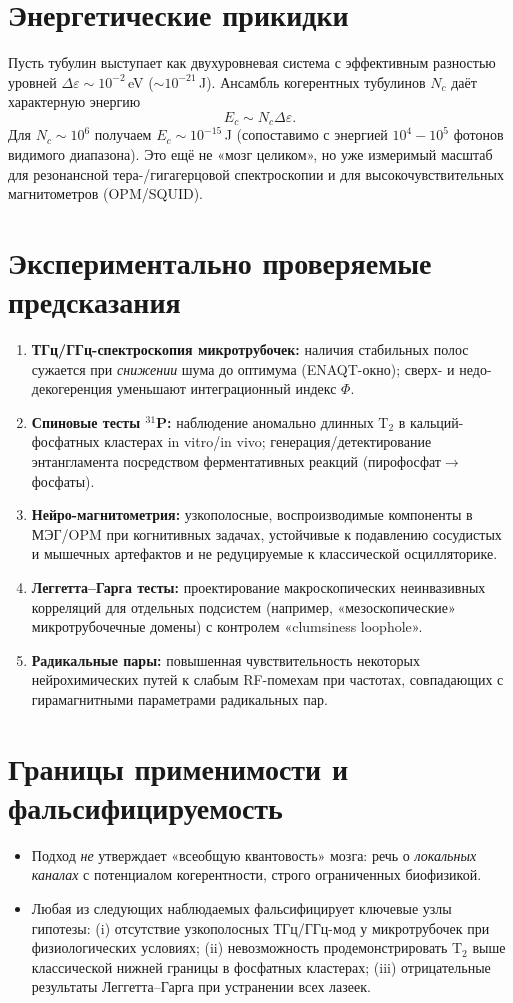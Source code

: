 \documentclass[12pt,a4paper]{article}
\begin{document}
\section{Энергетические прикидки}
Пусть тубулин выступает как двухуровневая система с эффективным разностью уровней $\Delta \varepsilon \sim 10^{-2}$\,eV ($\sim 10^{-21}$\,J). Ансамбль когерентных тубулинов $N_c$ даёт характерную энергию
\[
E_c \sim N_c \Delta\varepsilon.
\]
Для $N_c \sim 10^6$ получаем $E_c \sim 10^{-15}$\,J (сопоставимо с энергией $10^{4}\!-\!10^{5}$ фотонов видимого диапазона). Это ещё не «мозг целиком», но уже измеримый масштаб для резонансной тера-/гигагерцовой спектроскопии и для высокочувствительных магнитометров (OPM/SQUID).

\section{Экспериментально проверяемые предсказания}
\begin{enumerate}
\item \textbf{ТГц/ГГц-спектроскопия микротрубочек:} наличия стабильных полос сужается при \emph{снижении} шума до оптимума (ENAQT-окно); сверх- и недо-декогеренция уменьшают интеграционный индекс $\Phi$.
\item \textbf{Спиновые тесты $^{31}$P:} наблюдение аномально длинных T$_2$ в кальций-фосфатных кластерах in vitro/in vivo; генерация/детектирование энтангламента посредством ферментативных реакций (пирофосфат$\to$фосфаты).
\item \textbf{Нейро-магнитометрия:} узкополосные, воспроизводимые компоненты в МЭГ/OPM при когнитивных задачах, устойчивые к подавлению сосудистых и мышечных артефактов и не редуцируемые к классической осцилляторике.
\item \textbf{Леггетта–Гарга тесты:} проектирование макроскопических неинвазивных корреляций для отдельных подсистем (например, «мезоскопические» микротрубочечные домены) с контролем «clumsiness loophole».
\item \textbf{Радикальные пары:} повышенная чувствительность некоторых нейрохимических путей к слабым RF-помехам при частотах, совпадающих с гирамагнитными параметрами радикальных пар.
\end{enumerate}

\section{Границы применимости и фальсифицируемость}
\begin{itemize}
\item Подход \emph{не} утверждает «всеобщую квантовость» мозга: речь о \emph{локальных каналах} с потенциалом когерентности, строго ограниченных биофизикой.
\item Любая из следующих наблюдаемых фальсифицирует ключевые узлы гипотезы: (i) отсутствие узкополосных ТГц/ГГц-мод у микротрубочек при физиологических условиях; (ii) невозможность продемонстрировать T$_2$ выше классической нижней границы в фосфатных кластерах; (iii) отрицательные результаты Леггетта–Гарга при устранении всех лазеек.
\end{itemize}
\end{document}
